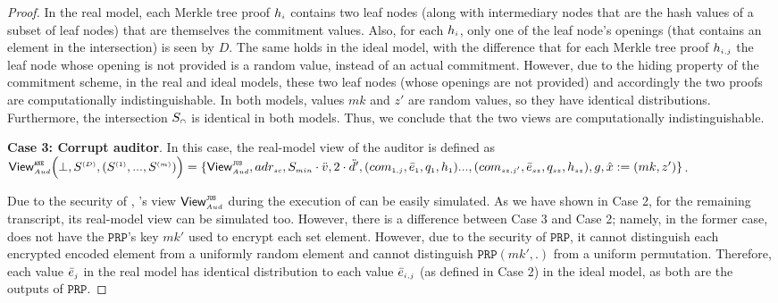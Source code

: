 \begin{proof}
 
 
 
 In the real model, each Merkle tree proof $h_{\scriptscriptstyle i}$ contains two leaf nodes (along with intermediary nodes that are the hash values of a subset of leaf nodes) that are themselves the commitment values. Also, for each $h_{\scriptscriptstyle i}$, only one of the leaf node's openings (that contains an element in the intersection) is seen by $D$. The same holds in the ideal model, with the difference that for each Merkle tree proof $h_{\scriptscriptstyle i, j}$ the leaf node whose opening is not provided is a random value, instead of an actual commitment. However, due to the hiding property of the commitment scheme, in the real and ideal models,  these two leaf nodes (whose openings are not provided) and accordingly the two proofs are computationally indistinguishable. In both models, values $mk$ and $z'$ are random values, so they have identical distributions. Furthermore, the intersection $S_{\scriptscriptstyle \cap}$ is identical in both models. Thus, we conclude that the two views are computationally indistinguishable.
 
 
 

\noindent\textbf{Case 3: Corrupt auditor}.  In this case, the real-model view of the auditor is defined as  
%
$ \mathsf{View}_{\st Aud}^{\st \epsi} \Big(\bot, S^{\st (D)}, (S^{\st (1)},..., S^{\st (m)})\Big)=
%
 \{\mathsf{View}^{\st \fpsi}_{\st Aud}, adr_{\st sc}, \Smin\cdot \vc, 2\cdot \dc', (com_{\st 1,j}, \bar{e}_{\st 1}, q_{\st 1}, h_{\st 1})..., (com_{\st sz, j'}, \bar{e}_{\st sz}, q_{\st {sz}}, h_{\st sz}), g, \hat{x}:=({mk}, z')\}$.


  Due to the security of \fpsi, \aud's view $\mathsf{View}^{\scriptscriptstyle \mathtt{JUS}}_{\scriptscriptstyle Aud}$ during the execution of \fpsi can be easily simulated. As we have shown in Case 2, for the remaining transcript, its real-model view can be simulated too. However, there is a difference between Case 3 and Case 2; namely, in the former case, \aud does not have the $\mathtt{PRP}$'s key $mk'$ used to encrypt each set element. However, due to the security of  $\mathtt{PRP}$, it cannot distinguish each encrypted encoded element from a uniformly random element and cannot distinguish $\mathtt{PRP}(mk',.)$ from a uniform permutation. Therefore, each value $\bar{e}_{\scriptscriptstyle j}$ in the real model has identical distribution to each value $\bar{e}_{\scriptscriptstyle i,j}$ (as defined in Case 2) in the ideal model, as both are the outputs of $\mathtt{PRP}$. 





\end{proof}
